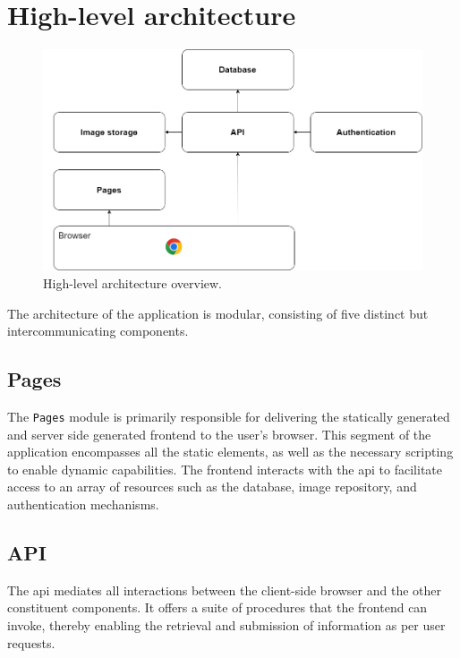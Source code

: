 \section{High-level architecture}

\begin{figure}
    \centering
    \includegraphics[width=\textwidth]{text/img/high-level.png}
    \caption{High-level architecture overview.}
    \label{fig:high-level}
\end{figure}

The architecture of the application is modular, consisting of five distinct but intercommunicating components.

\subsection{Pages}

The \texttt{Pages} module is primarily responsible for delivering the statically generated and server side generated frontend to the user's browser. This segment of the application encompasses all the static elements, as well as the necessary scripting to enable dynamic capabilities. The frontend interacts with the \acrshort{api} to facilitate access to an array of resources such as the database, image repository, and authentication mechanisms.

\subsection{API}

The \acrshort{api} mediates all interactions between the client-side browser and the other constituent components. It offers a suite of procedures that the frontend can invoke, thereby enabling the retrieval and submission of information as per user requests.

